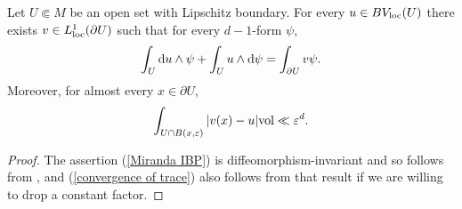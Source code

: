 \begin{proposition}\label{traces}
Let $U \Subset M$ be an open set with Lipschitz boundary.
For every $u \in BV_{\mathrm{loc}}(U)$ there exists $v \in L^1_{\mathrm{loc}}(\partial U)$ such that for every $d-1$-form $\psi$,
\begin{equation}\label{Miranda IBP}
\int_U \mathop{}\!\mathrm{d} u \wedge \psi + \int_U u \wedge \mathop{}\!\mathrm{d} \psi = \int_{\partial U} v\psi.
\end{equation}
Moreover, for almost every $x \in \partial U$,
\begin{equation}\label{convergence of trace}
\int_{U \cap B(x, \varepsilon)} |v(x) - u| \mathrm{vol} \ll \varepsilon^d.
\end{equation}
\end{proposition}
\begin{proof}
The assertion (\ref{Miranda IBP}) is diffeomorphism-invariant and so follows from \cite[Teorema 1]{Miranda67}, and (\ref{convergence of trace}) also follows from that result if we are willing to drop a constant factor.
%
%
\end{proof}

